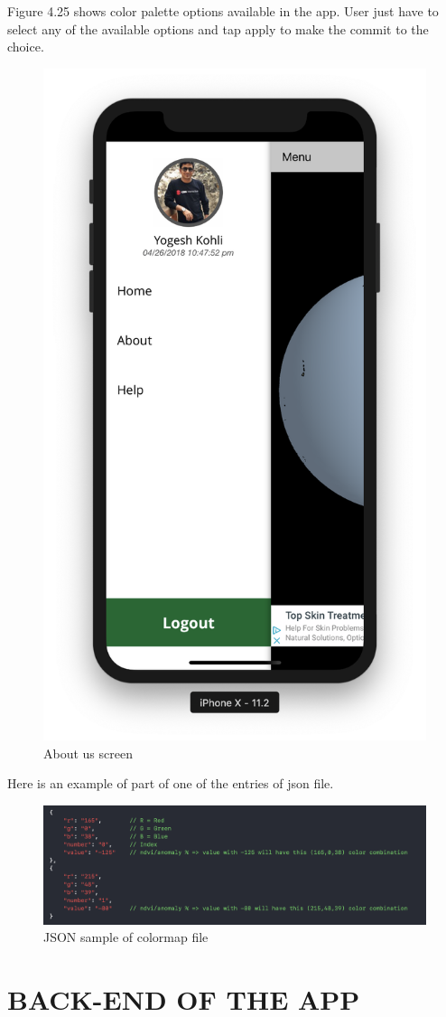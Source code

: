 \begin{itemize}
    Figure 4.25 shows color palette options available in the app. User just have to select any of the available options and tap apply to make the commit to the choice.
    
     \begin{figure}[H]
            \centering
            \includegraphics[width=0.35\linewidth]{figures/ch2/side_menu.png}
            \caption{\label{fig:pass_recovery_1} About us screen}
    \end{figure}
        
    Here is an example of part of one of the entries of \gls{json} file.
    
    \begin{figure}[H]
            \centering
            \includegraphics[width=1.0\linewidth]{figures/ch4/color_map_final.png}
            \caption{\label{fig:color_json} JSON sample of colormap file}
    \end{figure}

    \newpage
    
\end{itemize}






\section{BACK-END OF THE APP}


